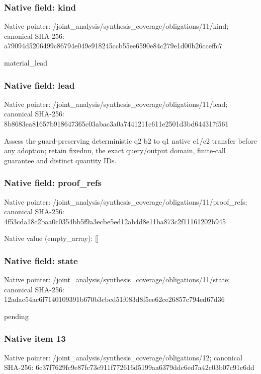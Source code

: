 \documentclass[10pt,a4paper]{article}
\begin{document}
\subsubsection{Native field: kind}
Native pointer: /joint\_\allowbreak{}analysis/synthesis\_\allowbreak{}coverage/obligations/11/kind; canonical SHA-256: a79094d5206499c86794e049e918245ccb55ee6590e84c279e1d00b26cceffc7

\begingroup\raggedright\sloppy material\_\allowbreak{}lead\par\endgroup

\subsubsection{Native field: lead}
Native pointer: /joint\_\allowbreak{}analysis/synthesis\_\allowbreak{}coverage/obligations/11/lead; canonical SHA-256: 8b8683ea81657b918647365c03abac3a0a7441211c611e2501d3bd644317f561

\begingroup\raggedright\sloppy Assess the guard-preserving deterministic q2 b2 to q1 native c1/\allowbreak{}c2 transfer before any adoption;\allowbreak{} retain fixednu,\allowbreak{} the exact query/\allowbreak{}output domain,\allowbreak{} finite-call guarantee and distinct quantity IDs.\par\endgroup

\subsubsection{Native field: proof\_\allowbreak{}refs}
Native pointer: /joint\_\allowbreak{}analysis/synthesis\_\allowbreak{}coverage/obligations/11/proof\_\allowbreak{}refs; canonical SHA-256: 4f53cda18c2baa0c0354bb5f9a3ecbe5ed12ab4d8e11ba873c2f11161202b945

Native value (empty\_\allowbreak{}array): []

\subsubsection{Native field: state}
Native pointer: /joint\_\allowbreak{}analysis/synthesis\_\allowbreak{}coverage/obligations/11/state; canonical SHA-256: 12adac54ac6f7140109391b670b3cbcd51f083d8f5ee62ce26857c794ed67d36

\begingroup\raggedright\sloppy pending\par\endgroup

\subsubsection{Native item 13}
Native pointer: /joint\_\allowbreak{}analysis/synthesis\_\allowbreak{}coverage/obligations/12; canonical SHA-256: 6c37f7629fc9e87fc73e911f772616d5199aa6379ddc6ed7a42c03b07c91c6dd
\end{document}
